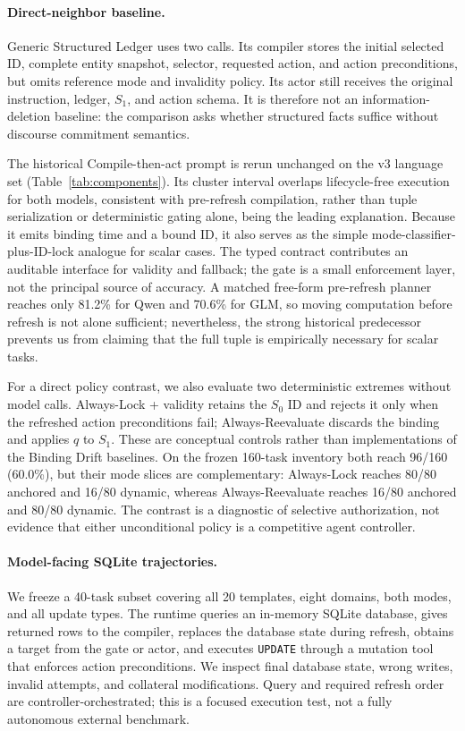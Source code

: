 \documentclass[letterpaper]{article}
\begin{document}
\paragraph{Direct-neighbor baseline.}
Generic Structured Ledger uses two calls. Its compiler stores the initial selected ID, complete
entity snapshot, selector, requested action, and action preconditions, but omits reference mode
and invalidity policy. Its actor still receives the original instruction, ledger, $S_1$, and
action schema. It is therefore not an information-deletion baseline: the comparison asks
whether structured facts suffice without discourse commitment semantics.

The historical Compile-then-act prompt is rerun unchanged on the v3 language set
(Table~\ref{tab:components}). Its cluster interval overlaps lifecycle-free execution for both
models, consistent with pre-refresh compilation, rather than tuple serialization or deterministic
gating alone, being the leading explanation. Because it emits binding time and a bound ID,
it also serves as the simple mode-classifier-plus-ID-lock analogue for scalar cases. The typed contract contributes an auditable
interface for validity and fallback; the gate is a small enforcement layer, not the principal
source of accuracy. A matched free-form pre-refresh planner reaches only 81.2\% for Qwen and
70.6\% for GLM, so moving computation before refresh is not alone sufficient; nevertheless,
the strong historical predecessor prevents us from claiming that the full tuple is empirically
necessary for scalar tasks.

For a direct policy contrast, we also evaluate two deterministic extremes without model calls.
Always-Lock + validity retains the $S_0$ ID and rejects it only when the refreshed action
preconditions fail; Always-Reevaluate discards the binding and applies $q$ to $S_1$. These are
conceptual controls rather than implementations of the Binding Drift baselines. On the frozen
160-task inventory both reach 96/160 (60.0\%), but their mode slices are complementary:
Always-Lock reaches 80/80 anchored and 16/80 dynamic, whereas Always-Reevaluate reaches
16/80 anchored and 80/80 dynamic. The contrast is a diagnostic of selective authorization,
not evidence that either unconditional policy is a competitive agent controller.

\paragraph{Model-facing SQLite trajectories.}
We freeze a 40-task subset covering all 20 templates, eight domains, both modes, and all update
types. The runtime queries an in-memory SQLite database, gives returned rows to the compiler,
replaces the database state during refresh, obtains a target from the gate or actor, and executes
\texttt{UPDATE} through a mutation tool that enforces action preconditions. We inspect final
database state, wrong writes, invalid attempts, and collateral modifications. Query and required
refresh order are controller-orchestrated; this is a focused execution test, not a fully
autonomous external benchmark.
\end{document}
